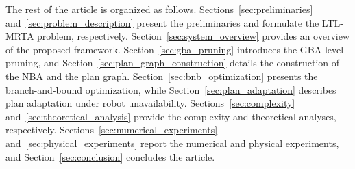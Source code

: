 \documentclass[lettersize,journal]{IEEEtran}
\theoremstyle{italiclemma}
\theoremstyle{italiclemma}
\theoremstyle{definition}
\begin{document}





The rest of the article is organized as follows. Sections~\ref{sec:preliminaries} and~\ref{sec:problem_description} present the preliminaries and formulate the LTL-MRTA problem, respectively. Section~\ref{sec:system_overview} provides an overview of the proposed framework. Section~\ref{sec:gba_pruning} introduces the GBA-level pruning, and Section~\ref{sec:plan_graph_construction} details the construction of the NBA and the plan graph.
Section~\ref{sec:bnb_optimization} presents the branch-and-bound optimization, while Section~\ref{sec:plan_adaptation} describes plan adaptation under robot unavailability. Sections~\ref{sec:complexity} and~\ref{sec:theoretical_analysis} provide the complexity and theoretical analyses, respectively. Sections~\ref{sec:numerical_experiments} and~\ref{sec:physical_experiments} report the numerical and physical experiments, and Section~\ref{sec:conclusion} concludes the article.
\end{document}
